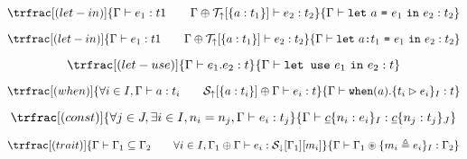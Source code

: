 \documentclass{article}[11pt]
\newcommand{\term}[1]{\verb~#1~}
\begin{document}
    \[\trfrac[(let-in)]
    {\Gamma \vdash e_1 : t1 \qquad \Gamma \oplus {\cal T}_\uparrow[\{ a : t_1 \}] \vdash e_2 : t_2}
    {\Gamma \vdash \term{let} ~ a ~ \term{=} ~ e_1 ~ \term{in} ~ e_2 : t_2} \]

    \[\trfrac[(let-in)]
    {\Gamma \vdash e_1 : t1 \qquad \Gamma \oplus {\cal T}_\uparrow[\{ a : t_1 \}] \vdash e_2 : t_2}
    {\Gamma \vdash \term{let} ~ a \term{:} t_1 ~ \term{=} ~ e_1 ~ \term{in} ~ e_2 : t_2} \]

    \[\trfrac[(let-use)]
    {\Gamma \vdash e_1.e_2 : t}
    {\Gamma \vdash \term{let use} ~ e_1 ~ \term{in} ~ e_2 : t} \]

    \[\trfrac[(when)]
    {\forall i \in I, \Gamma \vdash a : t_i \qquad {\cal S}_\uparrow[\{ a : t_i \}] \oplus \Gamma \vdash e_i : t }
    {\Gamma \vdash \term{when}(a).\{ t_i \rhd e_i \}_I : t} \]

    \[\trfrac[(const)]
    {\forall j \in J,\exists i \in I, n_i = n_j, \Gamma \vdash e_i : t_j }
    {\Gamma \vdash \underline{c} \{ n_i : e_i \}_I : \underline{c} \{ n_j : t_j \}_J } \]

    \[\trfrac[(trait)]
    {\Gamma \vdash \Gamma_1 \subseteq \Gamma_2 \qquad \forall i \in I, \Gamma_1 \oplus \Gamma \vdash e_i : {\cal S}_\downarrow[\Gamma_1][m_i] }
    {\Gamma \vdash \Gamma_1 \circledast \{ m_i \triangleq e_i \}_I : \Gamma_2 } \]
\end{document}
